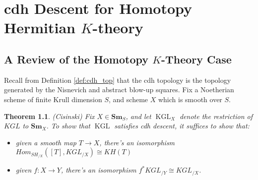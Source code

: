 \documentclass[edeposit,fullpage]{uiucthesis2009}
\newcommand{\mbb}{\mathbb}
\newcommand{\Sm}[1]{\mathbf{Sm}_{#1}}
\DeclareMathOperator{\iHom}{\mathbf{Hom}}
\DeclareMathOperator{\KGL}{KGL}
\theoremstyle{plain}
\numberwithin{lemma}{section}
\newtheorem{theorem}[lemma]{Theorem}
\theoremstyle{definition}
\begin{document}



\chapter{cdh Descent for Homotopy Hermitian $K$-theory}\label{chap:cdh}

\section{A Review of the Homotopy $K$-Theory Case}

Recall from Definition \ref{def:cdh_top} that the cdh topology is the
topology generated by the Nisnevich and abstract blow-up squares. Fix
a Noetherian scheme of finite Krull dimension $S$, and scheme $X$
which is smooth over $S$.

\begin{theorem}(Cisinski)
Fix $X \in \Sm{S}$, and let $\KGL_X$ denote the restriction of $KGL$
to $\Sm{X}$. To show that $\KGL$ satisfies cdh descent, it suffices to
show that:
\begin{itemize}
\item given a smooth map $T \rightarrow X$, there's an isomorphism
  $Hom_{SH_{/X}}([T], KGL_{/X}) \cong KH(T)$
\item given $f : X \rightarrow Y$, there's an isomorphism $f^* KGL_{/Y} \cong KGL_{/X}$.
\end{itemize}
\end{theorem}
\end{document}
